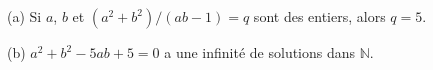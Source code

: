 (a) Si $a$, $b$ et $(a^2 + b^2)/(ab - 1) = q$ sont des entiers, alors $q = 5$.

(b) $a^2 + b^2 - 5ab + 5 = 0$ a une infinité de solutions dans $\mathbb{N}$.

